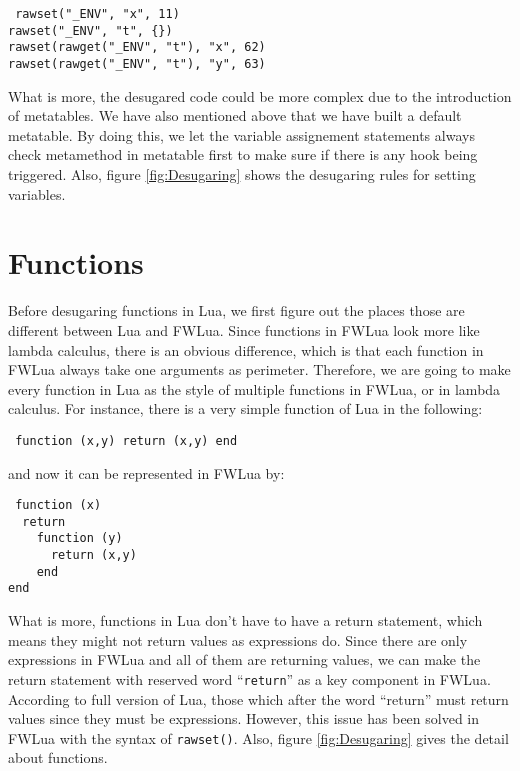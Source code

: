 \begin{flushleft}
{\tt
rawset("\_ENV", "x", 11)\\
rawset("\_ENV", "t", \{\})\\
rawset(rawget("\_ENV", "t"), "x", 62)\\
rawset(rawget("\_ENV", "t"), "y", 63)\\
}
\end{flushleft}

What is more, the desugared code could be more complex due to the introduction of metatables. We have also mentioned above that we have built a default metatable. By doing this, we let the variable assignement statements always check metamethod in metatable first to make sure if there is any hook being triggered. Also, figure \ref{fig:Desugaring} shows the desugaring rules for setting variables.

\section{Functions}
Before desugaring functions in Lua, we first figure out the places those are different between Lua and FWLua. Since functions in FWLua look more like lambda calculus, there is an obvious difference, which is that each function in FWLua always take one arguments as perimeter. Therefore, we are going to make every function in Lua as the style of multiple functions in FWLua, or in lambda calculus. For instance, there is a very simple function of Lua in the following:
\begin{flushleft}
{\tt
function (x,y) return (x,y) end
}
\end{flushleft}
and now it can be represented in FWLua by:
\begin{flushleft}
{\tt
function (x) \\
~~return \\
~~~~function (y) \\
~~~~~~return (x,y) \\
~~~~end \\
end \\
}
\end{flushleft}

What is more, functions in Lua don't have to have a return statement, which means they might not return values as expressions do. Since there are only expressions in FWLua and all of them are returning values, we can make the return statement with reserved word ``{\tt return}'' as a key component in FWLua. According to full version of Lua, those which after the word ``return'' must return values since they must be expressions. However, this issue has been solved in FWLua with the syntax of {\tt rawset()}. Also, figure \ref{fig:Desugaring} gives the detail about functions.

